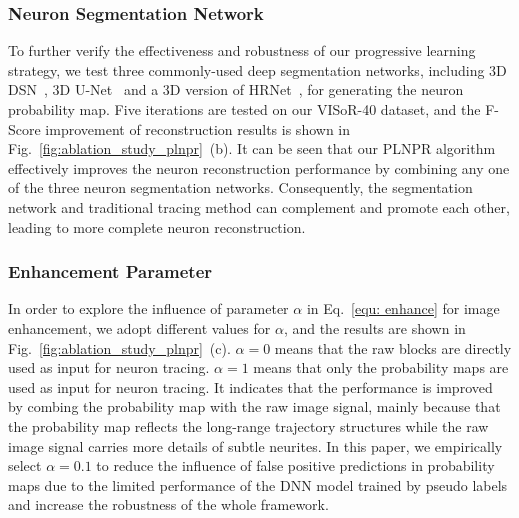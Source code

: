 \subsubsection{Neuron Segmentation Network}

To further verify the effectiveness and robustness of our progressive learning strategy, we test three commonly-used deep segmentation networks, including 3D DSN~\cite{Dou2017}, 3D U-Net~\cite{Cicek2016} and a 3D version of HRNet~\cite{Sun2019}, for generating the neuron probability map.
Five iterations are tested on our VISoR-40 dataset, and the F-Score improvement of reconstruction results is shown in Fig.~\ref{fig:ablation_study_plnpr}~(b). 
%
It can be seen that our PLNPR algorithm effectively improves the neuron reconstruction performance by combining any one of the three neuron segmentation networks.
Consequently, the segmentation network and traditional tracing method can complement and promote each other, leading to more complete neuron reconstruction.


\subsubsection{Enhancement Parameter} 

In order to explore the influence of parameter $\alpha$ in Eq.~\eqref{equ: enhance} for image enhancement, we adopt different values for $\alpha$, and the results are shown in Fig.~\ref{fig:ablation_study_plnpr}~(c).
$\alpha=0$ means that the raw blocks are directly used as input for neuron tracing.
$\alpha=1$ means that only the probability maps are used as input for neuron tracing. 
It indicates that the performance is improved by combing the probability map with the raw image signal, mainly because that the probability map reflects the long-range trajectory structures while the raw image signal carries more details of subtle neurites.
In this paper, we empirically select $\alpha=0.1$ to reduce the influence of false positive predictions in probability maps due to the limited performance of the DNN model trained by pseudo labels and increase the robustness of the whole framework.

